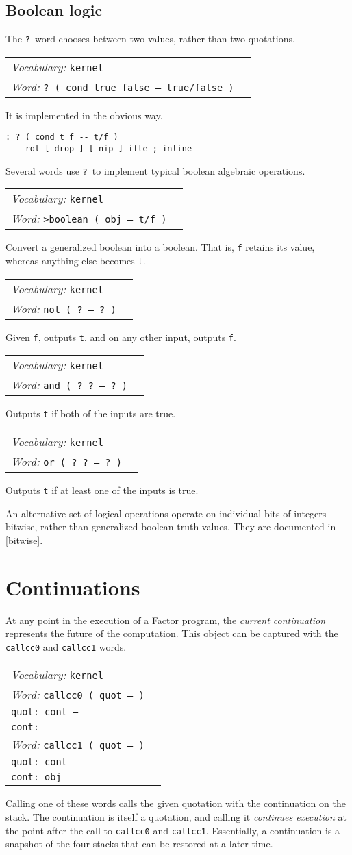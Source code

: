 \documentclass{book}
\newcommand{\vocabulary}[1]{\emph{Vocabulary:} \texttt{#1}&\\}
\newcommand{\ordinaryword}[2]{\index{\texttt{#1}}\emph{Word:} \texttt{#2}&\\}
\newcommand{\wordtable}[1]{


\begin{tabularx}{12cm}{lX}
\hline
#1
\hline
\end{tabularx}

}
\begin{document}
\subsection{Boolean logic}

The \texttt{?}~word chooses between two values, rather than two quotations.
\wordtable{
\vocabulary{kernel}
\ordinaryword{?}{?~( cond true false -- true/false )}
}
It is implemented in the obvious way.
\begin{verbatim}
: ? ( cond t f -- t/f )
    rot [ drop ] [ nip ] ifte ; inline
\end{verbatim}
Several words use \texttt{?}~to implement typical boolean algebraic operations.
\wordtable{
\vocabulary{kernel}
\ordinaryword{>boolean}{>boolean ( obj -- t/f )}
}
Convert a generalized boolean into a boolean. That is, \texttt{f} retains its value, whereas anything else becomes \texttt{t}.
\wordtable{
\vocabulary{kernel}
\ordinaryword{not}{not ( ?~-- ?~)}
}
Given \texttt{f}, outputs \texttt{t}, and on any other input, outputs \texttt{f}.
\wordtable{
\vocabulary{kernel}
\ordinaryword{and}{and ( ?~?~-- ?~)}
}
Outputs \texttt{t} if both of the inputs are true.
\wordtable{
\vocabulary{kernel}
\ordinaryword{or}{or ( ?~?~-- ?~)}
}
Outputs \texttt{t} if at least one of the inputs is true.

An alternative set of logical operations operate on individual bits of integers bitwise, rather than generalized boolean truth values. They are documented in \ref{bitwise}.

\section{Continuations}

\newcommand{\contglos}{
}
\contglos
At any point in the execution of a Factor program, the \emph{current continuation} represents the future of the computation. This object can be captured with the \texttt{callcc0} and \texttt{callcc1} words.
\wordtable{
\vocabulary{kernel}
\ordinaryword{callcc0}{callcc0 ( quot -- )}
\texttt{quot:~cont --}\\
\texttt{cont:~--}\\
\ordinaryword{callcc1}{callcc1 ( quot -- )}
\texttt{quot:~cont --}\\
\texttt{cont:~obj --}\\
}
Calling one of these words calls the given quotation with the continuation on the stack. The continuation is itself a quotation, and calling it \emph{continues execution} at the point after the call to \texttt{callcc0} and \texttt{callcc1}. Essentially, a continuation is a snapshot of the four stacks that can be restored at a later time.
\end{document}
